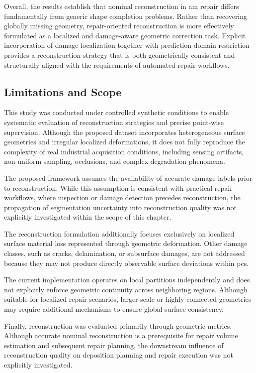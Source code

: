 Overall, the results establish that nominal reconstruction in \ac{am} repair differs fundamentally from generic shape completion problems. Rather than recovering globally missing geometry, repair-oriented reconstruction is more effectively formulated as a localized and damage-aware geometric correction task. Explicit incorporation of damage localization together with prediction-domain restriction provides a reconstruction strategy that is both geometrically consistent and structurally aligned with the requirements of automated repair workflows.

\subsection{Limitations and Scope}

This study was conducted under controlled synthetic conditions to enable systematic evaluation of reconstruction strategies and precise point-wise supervision. Although the proposed dataset incorporates heterogeneous surface geometries and irregular localized deformations, it does not fully reproduce the complexity of real industrial acquisition conditions, including sensing artifacts, non-uniform sampling, occlusions, and complex degradation phenomena.

The proposed framework assumes the availability of accurate damage labels prior to reconstruction. While this assumption is consistent with practical repair workflows, where inspection or damage detection precedes reconstruction, the propagation of segmentation uncertainty into reconstruction quality was not explicitly investigated within the scope of this chapter.

The reconstruction formulation additionally focuses exclusively on localized surface material loss represented through geometric deformation. Other damage classes, such as cracks, delamination, or subsurface damages, are not addressed because they may not produce directly observable surface deviations within \acp{pc}.

The current implementation operates on local partitions independently and does not explicitly enforce geometric continuity across neighboring regions. Although suitable for localized repair scenarios, larger-scale or highly connected geometries may require additional mechanisms to ensure global surface consistency.

Finally, reconstruction was evaluated primarily through geometric metrics. Although accurate nominal reconstruction is a prerequisite for repair volume estimation and subsequent repair planning, the downstream influence of reconstruction quality on deposition planning and repair execution was not explicitly investigated.

